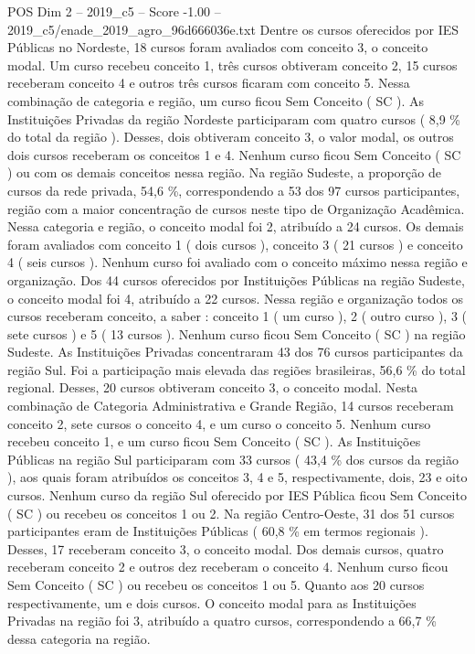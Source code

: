 \begin{textsample}{POS Dim 2 – 2019\_c5 – Score -1.00 – 2019\_c5/enade\_2019\_agro\_96d666036e.txt}
Dentre os cursos oferecidos por IES Públicas no Nordeste, 18 cursos foram avaliados com conceito 3, o conceito modal.
Um curso recebeu conceito 1, três cursos obtiveram conceito 2, 15 cursos receberam conceito 4 e outros três cursos ficaram com conceito 5.
Nessa combinação de categoria e região, um curso ficou Sem Conceito ( SC ).
As Instituições Privadas da região Nordeste participaram com quatro cursos ( 8,9 \% do total da região ).
Desses, dois obtiveram conceito 3, o valor modal, os outros dois cursos receberam os conceitos 1 e 4.
Nenhum curso ficou Sem Conceito ( SC ) ou com os demais conceitos nessa região.
Na região Sudeste, a proporção de cursos da rede privada, 54,6 \%, correspondendo a 53 dos 97 cursos participantes, região com a maior concentração de cursos neste tipo de Organização Acadêmica.
Nessa categoria e região, o conceito modal foi 2, atribuído a 24 cursos.
Os demais foram avaliados com conceito 1 ( dois cursos ), conceito 3 ( 21 cursos ) e conceito 4 ( seis cursos ).
Nenhum curso foi avaliado com o conceito máximo nessa região e organização.
Dos 44 cursos oferecidos por Instituições Públicas na região Sudeste, o conceito modal foi 4, atribuído a 22 cursos.
Nessa região e organização todos os cursos receberam conceito, a saber : conceito 1 ( um curso ), 2 ( outro curso ), 3 ( sete cursos ) e 5 ( 13 cursos ).
Nenhum curso ficou Sem Conceito ( SC ) na região Sudeste.
As Instituições Privadas concentraram 43 dos 76 cursos participantes da região Sul.
Foi a participação mais elevada das regiões brasileiras, 56,6 \% do total regional.
Desses, 20 cursos obtiveram conceito 3, o conceito modal.
Nesta combinação de Categoria Administrativa e Grande Região, 14 cursos receberam conceito 2, sete cursos o conceito 4, e um curso o conceito 5.
Nenhum curso recebeu conceito 1, e um curso ficou Sem Conceito ( SC ).
As Instituições Públicas na região Sul participaram com 33 cursos ( 43,4 \% dos cursos da região ), aos quais foram atribuídos os conceitos 3, 4 e 5, respectivamente, dois, 23 e oito cursos.
Nenhum curso da região Sul oferecido por IES Pública ficou Sem Conceito ( SC ) ou recebeu os conceitos 1 ou 2.
Na região Centro-Oeste, 31 dos 51 cursos participantes eram de Instituições Públicas ( 60,8 \% em termos regionais ).
Desses, 17 receberam conceito 3, o conceito modal.
Dos demais cursos, quatro receberam conceito 2 e outros dez receberam o conceito 4.
Nenhum curso ficou Sem Conceito ( SC ) ou recebeu os conceitos 1 ou 5.
Quanto aos 20 cursos respectivamente, um e dois cursos.
O conceito modal para as Instituições Privadas na região foi 3, atribuído a quatro cursos, correspondendo a 66,7 \% dessa categoria na região.

\end{textsample}
